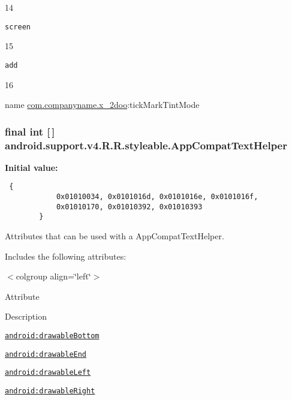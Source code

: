 14

{\tt screen}

15

{\tt add}

16

name \hyperlink{namespacecom_1_1companyname_1_1x__2doo}{com.companyname.x\_\-2doo}:tickMarkTintMode \hypertarget{classandroid_1_1support_1_1v4_1_1_r_1_1styleable_4b08e16e18a4842ae56614fdc42afc26}{
\subsubsection[{AppCompatTextHelper}]{\setlength{\rightskip}{0pt plus 5cm}final int \mbox{[}$\,$\mbox{]} android.support.v4.R.R.styleable.AppCompatTextHelper}}
\label{classandroid_1_1support_1_1v4_1_1_r_1_1styleable_4b08e16e18a4842ae56614fdc42afc26}


\textbf{Initial value:}

\begin{Code}\begin{verbatim} {
            0x01010034, 0x0101016d, 0x0101016e, 0x0101016f,
            0x01010170, 0x01010392, 0x01010393
        }
\end{verbatim}
\end{Code}
Attributes that can be used with a AppCompatTextHelper. 

Includes the following attributes: \begin{TabularC}{0}
\hline
\end{TabularC}
$<$colgroup align=\char`\"{}left\char`\"{}$>$ 

Attribute

Description 

{\tt \hyperlink{classandroid_1_1support_1_1v4_1_1_r_1_1styleable_e8e753980ae0cf7f493ad35506fd4eb8}{android:drawableBottom}}

{\tt \hyperlink{classandroid_1_1support_1_1v4_1_1_r_1_1styleable_c2187047de5b30284c00a650592eaad5}{android:drawableEnd}}

{\tt \hyperlink{classandroid_1_1support_1_1v4_1_1_r_1_1styleable_bc3975c5c5136d1f9f02b540cab86528}{android:drawableLeft}}

{\tt \hyperlink{classandroid_1_1support_1_1v4_1_1_r_1_1styleable_9f63da404fcb525c4df8b777c6ae5ce5}{android:drawableRight}}

